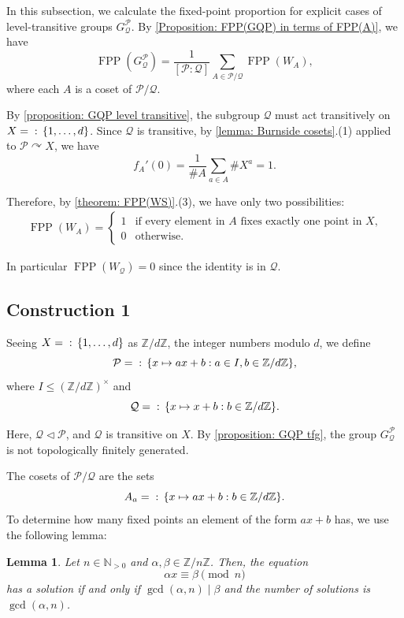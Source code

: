\documentclass{amsart}
\def\set#1{{\def\st{\;:\;}\left\{#1\right\}}}
\def\ZZ{\mathbb Z}
\def\NN{\mathbb N}
\DeclareMathOperator{\FPP}{FPP}
\DeclareMathOperator{\st}{st}
\newtheorem{Lemma}[Proposition]{Lemma}
\begin{document}
In this subsection, we calculate the fixed-point proportion for explicit cases of level-transitive groups $G_\mathcal{Q}^\mathcal{P}$. By \cref{Proposition: FPP(GQP) in terms of FPP(A)}, we have  $$\FPP(G_\mathcal{Q}^\mathcal{P}) = \frac{1}{[\mathcal{P}:\mathcal{Q}]} \sum_{A \in \mathcal{P}/\mathcal{Q}} \FPP(W_A),$$ where each $A$ is a coset of $\mathcal{P}/\mathcal{Q}$. 

By \cref{proposition: GQP level transitive}, the subgroup $\mathcal{Q}$ must act transitively on $X = \set{1,\dots,d}$. Since $\mathcal{Q}$ is transitive, by \cref{lemma: Burnside cosets}.(1) applied to $\mathcal{P} \curvearrowright X$, we have $$f_A'(0) = \frac{1}{\# A} \sum_{a \in A} \# X^a = 1.$$

Therefore, by \cref{theorem: FPP(WS)}.(3), we have only two possibilities:
\begin{align*}
\FPP(W_A) = \left \{ \begin{matrix} 1 & \mbox{if every element in $A$ fixes exactly one point in $X$,} \\ 
0 & \mbox{otherwise.}
\end{matrix}\right.
\end{align*}

In particular $\FPP(W_\mathcal{Q}) = 0$ since the identity is in $\mathcal{Q}$.

\subsection{Construction 1}

Seeing $X = \set{1, \dots, d}$ as $\ZZ/d\ZZ$, the integer numbers modulo $d$, we define $$\mathcal{P} = \set{x \mapsto ax+b: a \in I, b \in \ZZ/d\ZZ},$$ where $I \leq (\ZZ/d\ZZ)^\times$ and $$\mathcal{Q} = \set{x \mapsto x+b: b \in \ZZ/d\ZZ}.$$ 

Here, $\mathcal{Q} \lhd \mathcal{P}$, and $\mathcal{Q}$ is transitive on $X$. By \cref{proposition: GQP tfg}, the group $G_\mathcal{Q}^\mathcal{P}$ is not topologically finitely generated.

The cosets of $\mathcal{P}/\mathcal{Q}$ are the sets $$A_a = \set{x \mapsto ax+b: b \in \ZZ/d\ZZ}.$$ To determine how many fixed points an element of the form $ax+b$ has, we use the following lemma:

\begin{Lemma}
Let $n \in \NN_{> 0}$ and $\alpha, \beta \in \ZZ/n\ZZ$. Then, the equation $$\alpha x \equiv \beta \pmod{n}$$ has a solution if and only if $\gcd(\alpha,n) \mid \beta$ and the number of solutions is $\gcd(\alpha, n)$. 
\label{lemma: solutions linear equations modulo n}
\end{Lemma}
\end{document}
